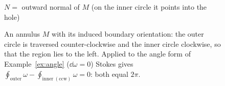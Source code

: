 \begin{figure}[ht]
\centering
{}

\small $N=$ outward normal of $M$ (on the inner circle it points into the hole)
\caption{An annulus $M$ with its induced boundary orientation: the outer circle is traversed counter-clockwise and the inner circle clockwise, so that the region lies to the left. Applied to the angle form of Example~\ref{ex:angle} ($\dd\omega=0$) Stokes gives $\oint_{\mathrm{outer}}\omega-\oint_{\mathrm{inner\ (ccw)}}\omega=0$: both equal $2\pi$.}
\label{fig:annulus}
\end{figure}
